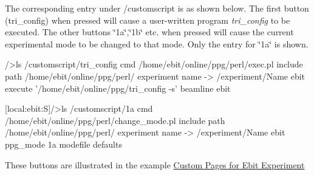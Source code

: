 The corresponding entry under /customscript is as shown below. The first button (tri\_\-config) when pressed will cause a user-\/written program {\itshape  tri\_\-config \/} to be executed. The other buttons \char`\"{}1a\char`\"{},\char`\"{}1b\char`\"{} etc. when pressed will cause the current experimental mode to be changed to that mode. Only the entry for \char`\"{}1a\char`\"{} is shown. 
\begin{DoxyCode}
/>ls /customscript/tri_config
cmd                             /home/ebit/online/ppg/perl/exec.pl
include path                    /home/ebit/online/ppg/perl/
experiment name -> /experiment/Name
                                ebit
execute                         '/home/ebit/online/ppg/tri_config -s'
beamline                        ebit

[local:ebit:S]/>ls /customscript/1a
cmd                             /home/ebit/online/ppg/perl/change_mode.pl
include path                    /home/ebit/online/ppg/perl/
experiment name -> /experiment/Name
                                ebit
ppg_mode                        1a
modefile                        defaults
\end{DoxyCode}


These buttons are illustrated in the example \hyperlink{RC_Ebit_custom_page}{Custom Pages for Ebit Experiment}

\par


\par


